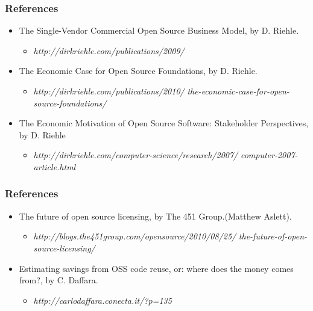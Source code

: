 
\begin{frame}
\frametitle{References}
\begin{itemize}
  \item The Single-Vendor Commercial Open Source Business Model, by D. Riehle.
  \begin{itemize}
   \item \footnotesize{\textit{http://dirkriehle.com/publications/2009/}}
  \end{itemize}

  \item The Economic Case for Open Source Foundations, by D. Riehle.
  \begin{itemize}
   \item \footnotesize{\textit{http://dirkriehle.com/publications/2010/}}
   \footnotesize{\textit{the-economic-case-for-open-source-foundations/}}
  \end{itemize}

  \item The Economic Motivation of Open Source Software: Stakeholder Perspectives, by D. Riehle
  \begin{itemize}
   \item \footnotesize{\textit{http://dirkriehle.com/computer-science/research/2007/}}
   \footnotesize{\textit{computer-2007-article.html}}
  \end{itemize}

\end{itemize}
\end{frame}


\begin{frame}
\frametitle{References}
\begin{itemize}
  \item The future of open source licensing, by The 451 Group.(Matthew Aslett).
  \begin{itemize}
   \item \footnotesize{\textit{http://blogs.the451group.com/opensource/2010/08/25/}}
    \footnotesize{\textit{the-future-of-open-source-licensing/}}
  \end{itemize}

  \item Estimating savings from OSS code reuse, or: where does the money comes from?, by C. Daffara.
  \begin{itemize}
   \item \footnotesize{\textit{http://carlodaffara.conecta.it/?p=135}}
  \end{itemize}

\end{itemize}
\end{frame}

